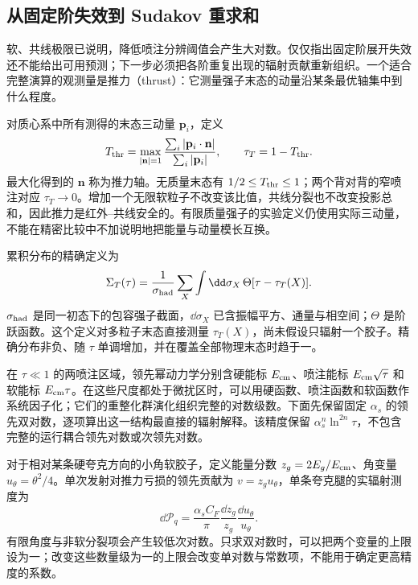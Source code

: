 \subsection{从固定阶失效到 Sudakov 重求和}
\label{sec:qcd-sudakov-thrust-applications}

软、共线极限已说明，降低喷注分辨阈值会产生大对数。仅仅指出固定阶展开失效还不能给出可用预测；下一步必须把各阶重复出现的辐射贡献重新组织。一个适合完整演算的观测量是推力（thrust）：它测量强子末态的动量沿某条最优轴集中到什么程度。

对质心系中所有测得的末态三动量 $\mathbf p_i$，定义
\begin{equation}
 T_{\rm thr}=\max_{|\mathbf n|=1}
 \frac{\sum_i|\mathbf p_i\cdot\mathbf n|}{\sum_i|\mathbf p_i|},
 \qquad \tau_T=1-T_{\rm thr}.
 \label{eq:qcd-thrust-definition}
\end{equation}
最大化得到的 $\mathbf n$ 称为推力轴。无质量末态有 $1/2\leq T_{\rm thr}\leq1$；两个背对背的窄喷注对应 $\tau_T\to0$。增加一个无限软粒子不改变该比值，共线分裂也不改变投影总和，因此推力是红外--共线安全的。有限质量强子的实验定义仍使用实际三动量，不能在精密比较中不加说明地把能量与动量模长互换。

累积分布的精确定义为
\begin{equation}
 \Sigma_T(\tau)=\frac{1}{\sigma_{\rm had}}
 \sum_X\int\dd\sigma_X\,
 \Theta[\tau-\tau_T(X)].
 \label{eq:qcd-thrust-cumulant}
\end{equation}
$\sigma_{\rm had}$ 是同一初态下的包容强子截面，$\dd\sigma_X$ 已含振幅平方、通量与相空间；$\Theta$ 是阶跃函数。这个定义对多粒子末态直接测量 $\tau_T(X)$，尚未假设只辐射一个胶子。精确分布非负、随 $\tau$ 单调增加，并在覆盖全部物理末态时趋于一。

在 $\tau\ll1$ 的两喷注区域，领先幂动力学分别含硬能标 $E_{\rm cm}$、喷注能标 $E_{\rm cm}\sqrt\tau$ 和软能标 $E_{\rm cm}\tau$。在这些尺度都处于微扰区时，可以用硬函数、喷注函数和软函数作系统因子化；它们的重整化群演化组织完整的对数级数\cite{BecherSchwartz2008Thrust}。下面先保留固定 $\alpha_s$ 的领先双对数，逐项算出这一结构最直接的辐射解释。该精度保留 $\alpha_s^n\ln^{2n}\tau$，不包含完整的运行耦合领先对数或次领先对数。

对于相对某条硬夸克方向的小角软胶子，定义能量分数 $z_g=2E_g/E_{\rm cm}$、角变量 $u_\theta=\theta^2/4$。单次发射对推力亏损的领先贡献为 $v=z_gu_\theta$，单条夸克腿的实辐射测度为
\begin{equation}
 \dd\mathcal P_q=\frac{\alpha_sC_F}{\pi}
 \frac{\dd z_g}{z_g}\frac{\dd u_\theta}{u_\theta}.
 \label{eq:qcd-thrust-emission-measure}
\end{equation}
有限角度与非软分裂项会产生较低次对数。只求双对数时，可以把两个变量的上限设为一；改变这些数量级为一的上限会改变单对数与常数项，不能用于确定更高精度的系数。

